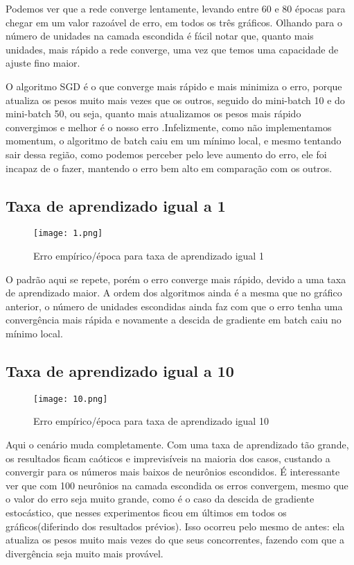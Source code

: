 \documentclass[a4paper, 11pt]{article}
\begin{document}
Podemos ver que a rede converge lentamente, levando entre 60 e 80 épocas para chegar em um valor razoável de erro, em todos os três gráficos. Olhando para o número de unidades na camada escondida é fácil notar que, quanto mais unidades, mais rápido a rede converge, uma vez que temos uma capacidade de ajuste fino maior. 

O algoritmo SGD é o que converge mais rápido e mais minimiza o erro, porque atualiza os pesos muito mais vezes que os outros, seguido do mini-batch 10 e do mini-batch 50, ou seja, quanto mais atualizamos os pesos mais rápido convergimos e melhor é o nosso erro .Infelizmente, como não implementamos momentum, o algoritmo de batch caiu em um mínimo local, e mesmo tentando sair dessa região, como podemos perceber pelo leve aumento do erro, ele foi incapaz de o fazer, mantendo o erro bem alto em comparação com os outros.

\subsection{Taxa de aprendizado igual a 1}

\begin{figure}[h]	
\centering
\texttt{[image: 1.png]}
\caption{Erro empírico/época para taxa de aprendizado igual 1}
\end{figure}

O padrão aqui se repete, porém o erro converge mais rápido, devido a uma taxa de aprendizado maior. A ordem dos algoritmos ainda é a mesma que no gráfico anterior, o número de unidades escondidas ainda faz com que o erro tenha uma convergência mais rápida e novamente a descida de gradiente em batch caiu no mínimo local.



\subsection{Taxa de aprendizado igual a 10}

\begin{figure}[!htb]	
\centering
\texttt{[image: 10.png]}
\caption{Erro empírico/época para taxa de aprendizado igual 10}
\end{figure}

Aqui o cenário muda completamente. Com uma taxa de aprendizado tão grande, os resultados ficam caóticos e imprevisíveis na maioria dos casos, custando a convergir para os números mais baixos de neurônios escondidos. É interessante ver que com 100 neurônios na camada escondida os erros convergem, mesmo que o valor do erro seja muito grande, como é o caso da descida de gradiente estocástico, que nesses experimentos ficou em últimos em todos os gráficos(diferindo dos resultados prévios). Isso ocorreu pelo mesmo de antes: ela atualiza os pesos muito mais vezes do que seus concorrentes, fazendo com que a divergência seja muito mais provável.
\end{document}
